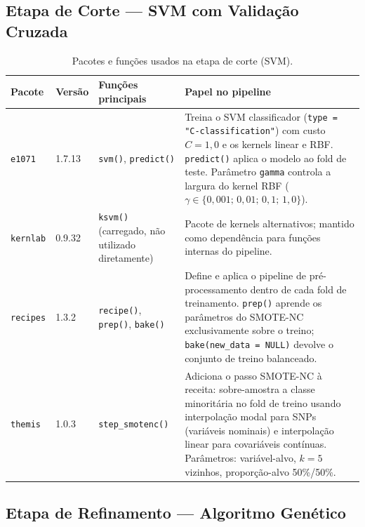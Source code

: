 \documentclass[
    12pt,
    a4paper,
    oneside,
    english,
    french,
    spanish,
    brazil
    ]{abntex2}
\renewcommand{\arraystretch}{1.3}
\newcommand{\novo}[1]{\textcolor{corNova}{#1}}
\begin{document}
\subsection*{Etapa de Corte --- SVM com Validação Cruzada}

\begin{table}[H]
\centering
\caption{\novo{Pacotes e funções usados na etapa de corte (SVM).}}
\label{tab:pkgs_svm}
\small
\renewcommand{\arraystretch}{1.35}
\begin{tabular}{L{2.4cm}|C{1.4cm}|L{4.2cm}|L{5.4cm}}
\hline
\textbf{Pacote} & \textbf{Versão} & \textbf{Funções principais} & \textbf{Papel no pipeline} \\
\hline
\texttt{e1071} & 1.7.13 &
  \texttt{svm()}, \texttt{predict()} &
  Treina o SVM classificador (\texttt{type = "C-classification"}) com custo $C = 1{,}0$ e os kernels linear e RBF. \texttt{predict()} aplica o modelo ao fold de teste. Parâmetro \texttt{gamma} controla a largura do kernel RBF ($\gamma \in \{0{,}001;\,0{,}01;\,0{,}1;\,1{,}0\}$). \\
\hline
\texttt{kernlab} & 0.9.32 &
  \texttt{ksvm()} (carregado, não utilizado diretamente) &
  Pacote de kernels alternativos; mantido como dependência para funções internas do pipeline. \\
\hline
\texttt{recipes} & 1.3.2 &
  \texttt{recipe()}, \texttt{prep()}, \texttt{bake()} &
  Define e aplica o pipeline de pré-processamento dentro de cada fold de treinamento. \texttt{prep()} aprende os parâmetros do SMOTE-NC exclusivamente sobre o treino; \texttt{bake(new\_data = NULL)} devolve o conjunto de treino balanceado. \\
\hline
\texttt{themis} & 1.0.3 &
  \texttt{step\_smotenc()} &
  Adiciona o passo SMOTE-NC à receita: sobre-amostra a classe minoritária no fold de treino usando interpolação modal para SNPs (variáveis nominais) e interpolação linear para covariáveis contínuas. Parâmetros: variável-alvo, $k = 5$ vizinhos, proporção-alvo 50\%/50\%. \\
\hline
\end{tabular}
\end{table}

\subsection*{Etapa de Refinamento --- Algoritmo Genético}
\end{document}
